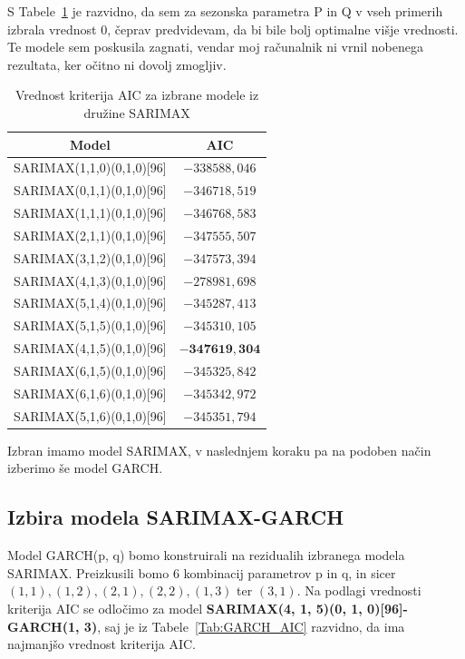 \documentclass[a4paper, 11pt]{article}
\begin{document}
\noindent S Tabele~\ref{Tab:SARIMA_AIC} je razvidno, da sem za sezonska parametra P in Q v vseh primerih izbrala 
vrednost $0$, čeprav predvidevam, da bi bile bolj optimalne višje vrednosti. Te modele sem poskusila zagnati, 
vendar moj računalnik ni vrnil nobenega rezultata, ker očitno ni dovolj zmogljiv. 

\begin{table}[!ht]
    \centering
    \caption{Vrednost kriterija AIC za izbrane modele iz družine SARIMAX}\par\medskip
    \label{Tab:SARIMA_AIC}
    \begin{tabular}{c|c}
        Model & AIC \\ \hline
        SARIMAX(1,1,0)(0,1,0)[96] & $-338588{,}046$ \\ 
        SARIMAX(0,1,1)(0,1,0)[96] & $-346718{,}519$ \\ 
        SARIMAX(1,1,1)(0,1,0)[96] & $-346768{,}583$ \\ 
        SARIMAX(2,1,1)(0,1,0)[96] & $-347555{,}507$ \\ 
        SARIMAX(3,1,2)(0,1,0)[96] & $-347573{,}394$ \\ 
        SARIMAX(4,1,3)(0,1,0)[96] & $-278981{,}698$ \\ 
        SARIMAX(5,1,4)(0,1,0)[96] & $-345287{,}413$ \\ 
        SARIMAX(5,1,5)(0,1,0)[96] & $-345310{,}105$ \\ 
        SARIMAX(4,1,5)(0,1,0)[96] & $\mathbf{-347619{,}304}$ \\ 
        SARIMAX(6,1,5)(0,1,0)[96] & $-345325{,}842$ \\ 
        SARIMAX(6,1,6)(0,1,0)[96] & $-345342{,}972$ \\ 
        SARIMAX(5,1,6)(0,1,0)[96] & $-345351{,}794$ \\
    \end{tabular}
\end{table}

\noindent Izbran imamo model SARIMAX, v naslednjem koraku pa na podoben način izberimo še model GARCH. 


\subsection{Izbira modela SARIMAX-GARCH}

Model GARCH(p, q) bomo konstruirali na rezidualih izbranega modela SARIMAX. Preizkusili bomo $6$ kombinacij 
parametrov p in q, in sicer $(1,1), (1,2), (2,1), (2,2), (1,3)$ ter $(3,1)$. 
Na podlagi vrednosti kriterija AIC se odločimo za model \textbf{SARIMAX(4, 1, 5)(0, 1, 0)[96]-GARCH(1, 3)}, saj
je iz Tabele~\ref{Tab:GARCH_AIC} razvidno, da ima najmanjšo vrednost kriterija AIC. 
\end{document}
